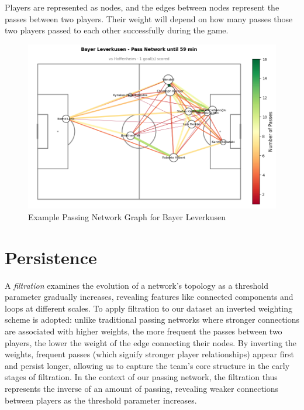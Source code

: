 \documentclass[10pt,twocolumn]{article}
\begin{document}
Players are represented as nodes, and the edges between nodes represent the passes between two players. Their weight will depend on how many passes those two players passed to each other successfully during the game. 

\begin{figure}[H]
    \centering
    \includegraphics[width= 1 \linewidth]{images/leverkusen.png}
    \caption{Example Passing Network Graph for Bayer Leverkusen}
    \label{fig:leverkusen}
\end{figure}


\section*{Persistence}

A \textit{filtration} examines the evolution of a network's topology as a threshold parameter gradually increases, revealing features like connected components and loops at different scales. To apply filtration to our dataset an inverted weighting scheme is adopted: unlike traditional passing networks where stronger connections are associated with higher weights, the more frequent the passes between two players, the lower the weight of the edge connecting their nodes.  By inverting the weights, frequent passes (which signify stronger player relationships) appear first and persist longer, allowing us to capture the team's core structure in the early stages of filtration. In the context of our passing network, the filtration thus represents the inverse of an amount of passing, revealing weaker connections between players as the threshold parameter increases.
\end{document}
